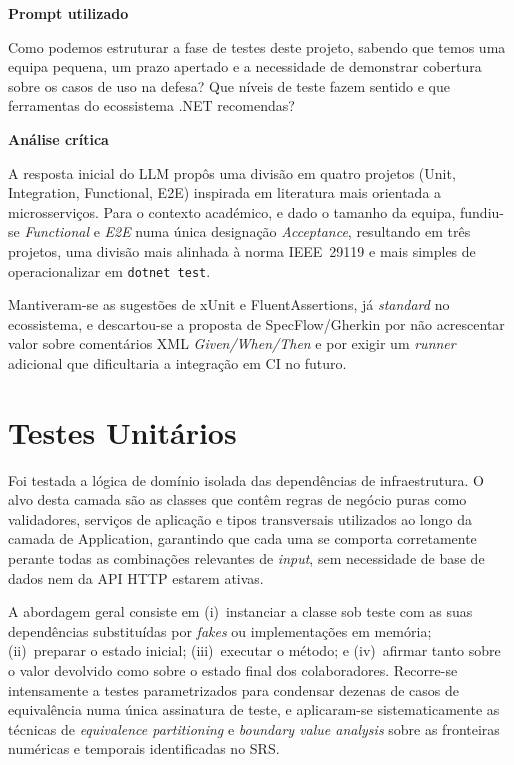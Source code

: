     \begin{tcolorbox}[title=Interação com o LLM]
    \textbf{Prompt utilizado}

    Como podemos estruturar a fase de testes deste projeto, sabendo que temos uma equipa pequena, um prazo apertado e a necessidade de demonstrar cobertura sobre os casos de uso na defesa? Que níveis de teste fazem sentido e que ferramentas do ecossistema .NET recomendas?

    \tcblower

    \textbf{Análise crítica}

    A resposta inicial do LLM propôs uma divisão em quatro projetos (Unit, Integration, Functional, E2E) inspirada em literatura mais orientada a microsserviços. Para o contexto académico, e dado o tamanho da equipa, fundiu-se \textit{Functional} e \textit{E2E} numa única designação \textit{Acceptance}, resultando em três projetos, uma divisão mais alinhada à norma IEEE~29119 e mais simples de operacionalizar em \texttt{dotnet test}.

    Mantiveram-se as sugestões de xUnit e FluentAssertions, já \textit{standard} no ecossistema, e descartou-se a proposta de SpecFlow/Gherkin por não acrescentar valor sobre comentários XML \textit{Given/When/Then} e por exigir um \textit{runner} adicional que dificultaria a integração em CI no futuro.
    \end{tcolorbox}

\section{Testes Unitários}

    Foi testada a lógica de domínio isolada das dependências de infraestrutura. O alvo desta camada são as classes que contêm regras de negócio puras como validadores, serviços de aplicação e tipos transversais utilizados ao longo da camada de Application, garantindo que cada uma se comporta corretamente perante todas as combinações relevantes de \textit{input}, sem necessidade de base de dados nem da API HTTP estarem ativas.

    A abordagem geral consiste em (i)~instanciar a classe sob teste com as suas dependências substituídas por \textit{fakes} ou implementações em memória; (ii)~preparar o estado inicial; (iii)~executar o método; e (iv)~afirmar tanto sobre o valor devolvido como sobre o estado final dos colaboradores. Recorre-se intensamente a testes parametrizados para condensar dezenas de casos de equivalência numa única assinatura de teste, e aplicaram-se sistematicamente as técnicas de \textit{equivalence partitioning} e \textit{boundary value analysis} sobre as fronteiras numéricas e temporais identificadas no SRS.

